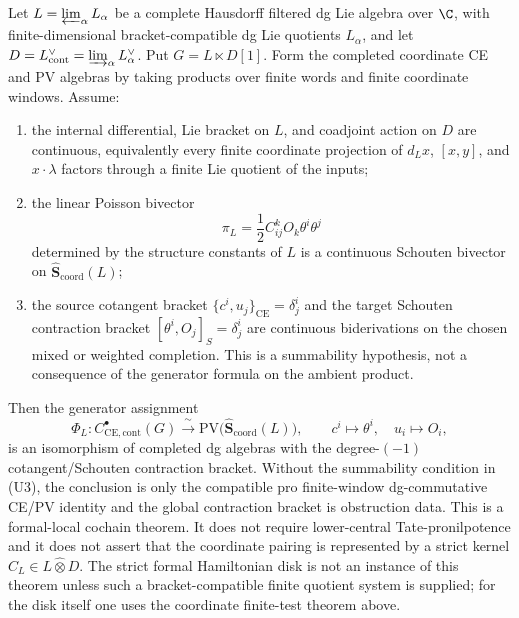 \begin{thm}\label{thm:universal-formal-local-ce-pv-recognition}
  Let \(L=\varprojlim_\alpha L_\alpha\) be a complete Hausdorff
  filtered dg Lie algebra over \(\C\), with finite-dimensional
  bracket-compatible dg Lie quotients \(L_\alpha\), and let
  \(D=L^\vee_{\mathrm{cont}}=\varinjlim_\alpha L_\alpha^\vee\).
  Put \(G=L\ltimes D[1]\).  Form the completed coordinate CE and PV
  algebras by taking products over finite words and finite coordinate
  windows.  Assume:
  \begin{enumerate}[label=(U\arabic*)]
    \item the internal differential, Lie bracket on \(L\), and
      coadjoint action on \(D\) are continuous, equivalently every
      finite coordinate projection of \(d_Lx\), \([x,y]\), and
      \(x\cdot\lambda\) factors through a finite Lie quotient of
      the inputs;
    \item the linear Poisson bivector
      \[
        \pi_L=\frac12 C^k_{ij}O_k\theta^i\theta^j
      \]
      determined by the structure constants of \(L\) is a continuous
      Schouten bivector on
      \(\widehat{\mathbf S}_{\mathrm{coord}}(L)\);
    \item the source cotangent bracket
      \(\{c^i,u_j\}_{\mathrm{CE}}=\delta^i_j\) and the target Schouten
      contraction bracket \([\theta^i,O_j]_S=\delta^i_j\) are continuous
      biderivations on the chosen mixed or weighted completion.  This is
      a summability hypothesis, not a consequence of the generator
      formula on the ambient product.
  \end{enumerate}
  Then the generator assignment
  \[
    \Phi_L\colon
    C^\bullet_{\mathrm{CE},\mathrm{cont}}(G)
    \xrightarrow{\ \sim\ }
    \mathrm{PV}\bigl(\widehat{\mathbf S}_{\mathrm{coord}}(L)\bigr),
    \qquad
    c^i\mapsto\theta^i,\quad u_i\mapsto O_i,
  \]
  is an isomorphism of completed dg algebras with the degree-\((-1)\)
  cotangent/Schouten contraction bracket.  Without the summability
  condition in (U3), the conclusion is only the compatible pro
  finite-window dg-commutative CE/PV identity and the global contraction
  bracket is obstruction data.  This is a formal-local cochain theorem.
  It does not require lower-central Tate-pronilpotence and it does not assert
  that the coordinate pairing is represented by a strict kernel
  \(C_L\in L\widehat\otimes D\).
  The strict formal Hamiltonian disk is not an instance of this theorem
  unless such a bracket-compatible finite quotient system is supplied;
  for the disk itself one uses the coordinate finite-test theorem above.
\end{thm}

